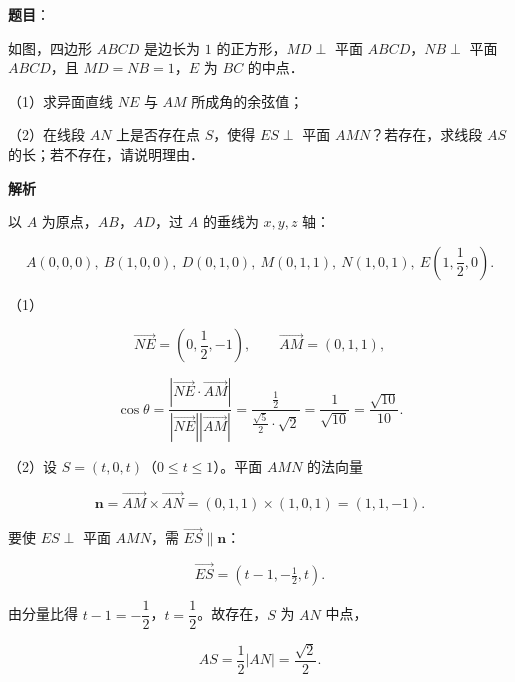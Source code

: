 \begin{answer}

\textbf{题目}：

如图，四边形 $ABCD$ 是边长为 $1$ 的正方形，$MD\perp$ 平面 $ABCD$，$NB\perp$ 平面 $ABCD$，且 $MD=NB=1$，$E$ 为 $BC$ 的中点．

（1）求异面直线 $NE$ 与 $AM$ 所成角的余弦值；

（2）在线段 $AN$ 上是否存在点 $S$，使得 $ES\perp$ 平面 $AMN$？若存在，求线段 $AS$ 的长；若不存在，请说明理由．
\nopagebreak[4]
\begin{center}\end{center}
\nopagebreak[4]
\textbf{解析}

以 $A$ 为原点，$AB$，$AD$，过 $A$ 的垂线为 $x,y,z$ 轴：

\nopagebreak[4]
\[A(0,0,0),\ B(1,0,0),\ D(0,1,0),\ M(0,1,1),\ N(1,0,1),\ E\left(1,\frac12,0\right).\]

（1）

\nopagebreak[4]
\[\overrightarrow{NE}=\left(0,\frac12,-1\right),\qquad \overrightarrow{AM}=(0,1,1),\]

\nopagebreak[4]
\[\cos\theta=\frac{\left|\overrightarrow{NE}\cdot\overrightarrow{AM}\right|}{|\overrightarrow{NE}||\overrightarrow{AM}|}
=\frac{\frac12}{\frac{\sqrt5}2\cdot\sqrt2}=\frac1{\sqrt{10}}=\frac{\sqrt{10}}{10}.\]

（2）设 $S=(t,0,t)$（$0\leqslant t\leqslant1$）。平面 $AMN$ 的法向量

\nopagebreak[4]
\[\boldsymbol n=\overrightarrow{AM}\times\overrightarrow{AN}
=(0,1,1)\times(1,0,1)=(1,1,-1).\]

要使 $ES\perp$ 平面 $AMN$，需 $\overrightarrow{ES}\parallel\boldsymbol n$：

\nopagebreak[4]
\[\overrightarrow{ES}=(t-1,-\tfrac12,t).\]

由分量比得 $t-1=-\dfrac12$，$t=\dfrac12$。故存在，$S$ 为 $AN$ 中点，

\nopagebreak[4]
\[AS=\frac12|AN|=\frac{\sqrt2}2.\]


\end{answer}

